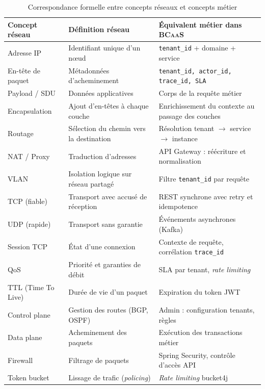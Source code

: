 \documentclass[12pt,a4paper]{report}
\theoremstyle{definition}
\theoremstyle{remark}
\newcommand{\bcaas}{\textsc{BCaaS}}
\newcommand{\api}{\textsc{API}}
\newcommand{\jwt}{\textsc{JWT}}
\newcommand{\rest}{\textsc{REST}}
\begin{document}
\begin{table}[h]
	\centering
	\caption{Correspondance formelle entre concepts réseaux et concepts métier}
	\label{tab:analogie}
	\begin{tabularx}{\textwidth}{lXX}
		\toprule
		\textbf{Concept réseau} & \textbf{Définition réseau} & \textbf{Équivalent métier dans \bcaas} \\
		\midrule
		Adresse IP & Identifiant unique d'un nœud & \texttt{tenant\_id} + domaine + service \\
		En-tête de paquet & Métadonnées d'acheminement & \texttt{tenant\_id, actor\_id, trace\_id, SLA} \\
		Payload / SDU & Données applicatives & Corps de la requête métier \\
		Encapsulation & Ajout d'en-têtes à chaque couche & Enrichissement du contexte au passage des couches \\
		Routage & Sélection du chemin vers la destination & Résolution tenant $\to$ service $\to$ instance \\
		NAT / Proxy & Traduction d'adresses & API Gateway : réécriture et normalisation \\
		VLAN & Isolation logique sur réseau partagé & Filtre \texttt{tenant\_id} par requête \\
		TCP (fiable) & Transport avec accusé de réception & \rest{} synchrone avec retry et idempotence \\
		UDP (rapide) & Transport sans garantie & Événements asynchrones (Kafka) \\
		Session TCP & État d'une connexion & Contexte de requête, corrélation \texttt{trace\_id} \\
		QoS & Priorité et garanties de débit & SLA par tenant, \textit{rate limiting} \\
		TTL (Time To Live) & Durée de vie d'un paquet & Expiration du token \jwt \\
		Control plane & Gestion des routes (BGP, OSPF) & Admin : configuration tenants, règles \\
		Data plane & Acheminement des paquets & Exécution des transactions métier \\
		Firewall & Filtrage de paquets & Spring Security, contrôle d'accès \api \\
		Token bucket & Lissage de trafic (\textit{policing}) & \textit{Rate limiting} bucket4j \\
		\bottomrule
	\end{tabularx}
\end{table}
\end{document}
